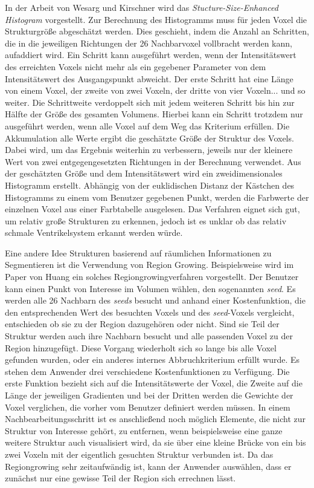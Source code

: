 In der Arbeit von Wesarg und Kirschner \cite{wesarg2009structure, wesarg20102d} wird das \textit{Stucture-Size-Enhanced Histogram} vorgestellt.
Zur Berechnung des Histogramms  muss für jeden Voxel die Strukturgröße abgeschätzt werden. Dies geschieht, indem die Anzahl an Schritten, die in die jeweiligen Richtungen der 26 Nachbarvoxel vollbracht werden kann, aufaddiert wird. Ein Schritt kann ausgeführt werden, wenn der Intensitätswert des erreichten Voxels nicht mehr als ein gegebener Parameter von dem Intensitätswert des Ausgangspunkt abweicht.
\newline
Der erste Schritt hat eine Länge von einem Voxel, der zweite von zwei Voxeln, der dritte von vier Voxeln... und so weiter. Die Schrittweite verdoppelt sich mit jedem weiteren Schritt bis hin zur Hälfte der Größe des gesamten Volumens. Hierbei kann ein Schritt trotzdem nur ausgeführt werden, wenn alle Voxel auf dem Weg das Kriterium erfüllen. Die Akkumulation alle Werte ergibt die geschätzte Größe der Struktur des Voxels. Dabei wird, um das Ergebnis weiterhin zu verbessern,  jeweils nur der kleinere Wert von zwei entgegengesetzten Richtungen in der Berechnung verwendet. 
Aus der geschätzten Größe und dem Intensitätswert wird ein zweidimensionales Histogramm erstellt. Abhängig von der euklidischen Distanz der Kästchen des Histogramms zu einem vom Benutzer gegebenen Punkt, werden die Farbwerte der einzelnen Voxel aus einer Farbtabelle ausgelesen.
\newline
Das Verfahren eignet sich gut, um relativ große Strukturen zu erkennen, jedoch ist es unklar ob das relativ schmale Ventrikelsystem erkannt werden würde.


Eine andere Idee Strukturen basierend auf räumlichen Informationen zu Segmentieren ist die Verwendung von Region Growing.
Beispielsweise wird im Paper von Huang \cite{huang2003rgvis} ein solches Regiongrowingverfahren vorgestellt. Der Benutzer kann einen Punkt von Interesse im Volumen wählen, den sogenannten \textit{seed}. Es werden alle 26 Nachbarn des \textit{seeds} besucht und anhand einer Kostenfunktion, die den entsprechenden Wert des besuchten Voxels und des \textit{seed}-Voxels vergleicht, entschieden ob sie zu der Region dazugehören oder nicht. Sind sie Teil der Struktur werden auch ihre Nachbarn besucht und alle passenden Voxel zu der Region hinzugefügt. Diese Vorgang wiederholt sich so lange bis alle Voxel gefunden wurden, oder ein anderes internes Abbruchkriterium erfüllt wurde.
\newline
Es stehen dem Anwender drei verschiedene Kostenfunktionen zu Verfügung. Die erste Funktion bezieht sich auf die Intensitätswerte der Voxel, die Zweite auf die Länge der jeweiligen Gradienten und bei der Dritten werden die Gewichte der Voxel verglichen, die vorher vom Benutzer definiert werden müssen.
In einem Nachbearbeitungsschritt ist es anschließend noch möglich Elemente, die nicht zur Struktur von Interesse gehört, zu entfernen, wenn beispielsweise eine ganze weitere Struktur auch visualisiert wird, da sie über eine kleine Brücke von ein bis zwei Voxeln mit der eigentlich gesuchten Struktur verbunden ist.
Da das Regiongrowing sehr zeitaufwändig ist, kann der Anwender auswählen, dass er zunächst nur eine gewisse Teil der Region sich errechnen lässt.


